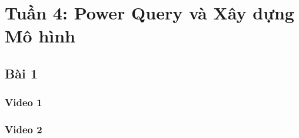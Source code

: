 \documentclass{article}
\begin{document}
\tableofcontents
\newpage
\listoffigures
\newpage
\section{Tuần 4: Power Query và Xây dựng Mô hình}
\subsection{Bài 1}
\subsubsection{Video 1}


\subsubsection{Video 2}


\end{document}
